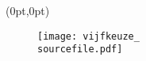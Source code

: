 \documentclass[a4paper,11pt]{article}
\begin{document}
\begin{textblock*}{597.4pt}(0pt,0pt)
	\begin{figure}[H]
  		\centering
  		\texttt{[image: vijfkeuze\_\\sourcefile.pdf]}
	\end{figure}
\end{textblock*}


\newlength{\xoffset}
\newlength{\yoffset}
\setcounter{itemnumber}{0}
\setcounter{yincr}{0}
\end{document}
